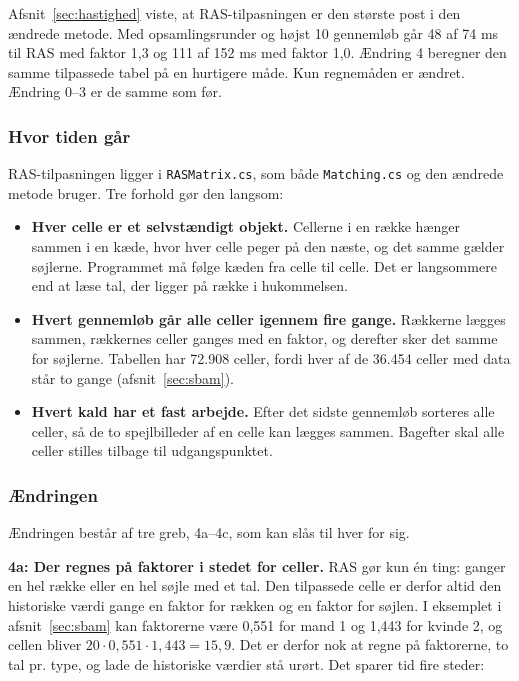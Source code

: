 \documentclass[11pt,a4paper]{article}
\newcommand{\kode}[1]{\texttt{#1}}
\begin{document}
Afsnit~\ref{sec:hastighed} viste, at RAS-tilpasningen er den største post i den ændrede metode. Med
opsamlingsrunder og højst 10 gennemløb går 48 af 74 ms til RAS med faktor 1,3 og 111 af 152 ms med
faktor 1,0. Ændring 4 beregner den samme tilpassede tabel på en hurtigere måde. Kun regnemåden er
ændret. Ændring 0--3 er de samme som før.

\subsubsection*{Hvor tiden går}

RAS-tilpasningen ligger i \kode{RASMatrix.cs}, som både \kode{Matching.cs} og den ændrede metode
bruger. Tre forhold gør den langsom:

\begin{itemize}
\item \textbf{Hver celle er et selvstændigt objekt.} Cellerne i en række hænger sammen i en kæde,
hvor hver celle peger på den næste, og det samme gælder søjlerne. Programmet må følge kæden fra celle
til celle. Det er langsommere end at læse tal, der ligger på række i hukommelsen.
\item \textbf{Hvert gennemløb går alle celler igennem fire gange.} Rækkerne lægges sammen, rækkernes
celler ganges med en faktor, og derefter sker det samme for søjlerne. Tabellen har 72.908 celler,
fordi hver af de 36.454 celler med data står to gange (afsnit~\ref{sec:sbam}).
\item \textbf{Hvert kald har et fast arbejde.} Efter det sidste gennemløb sorteres alle celler, så de
to spejlbilleder af en celle kan lægges sammen. Bagefter skal alle celler stilles tilbage til
udgangspunktet.
\end{itemize}

\subsubsection*{Ændringen}

Ændringen består af tre greb, 4a--4c, som kan slås til hver for sig.

\textbf{4a: Der regnes på faktorer i stedet for celler.} RAS gør kun én ting: ganger en hel række
eller en hel søjle med et tal. Den tilpassede celle er derfor altid den historiske værdi gange en
faktor for rækken og en faktor for søjlen. I eksemplet i afsnit~\ref{sec:sbam} kan faktorerne være
0,551 for mand 1 og 1,443 for kvinde 2, og cellen bliver $20\cdot 0{,}551\cdot 1{,}443=15{,}9$. Det
er derfor nok at regne på faktorerne, to tal pr. type, og lade de historiske værdier stå urørt. Det
sparer tid fire steder:
\end{document}
